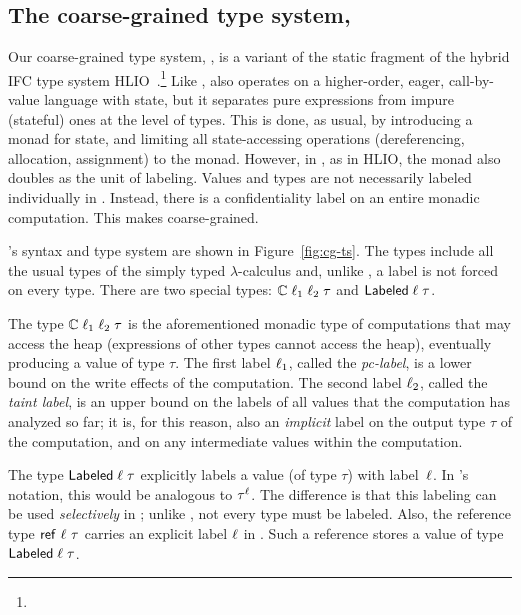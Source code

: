 \subsection{The coarse-grained type system, {\cg}}
\label{sec:cg}



Our coarse-grained type system, {\cg}, is a variant of the static
fragment of the hybrid IFC type system
HLIO~\cite{icfp15-HLIO}.\footnote{} Like {\fg}, {\cg} also operates on a
  higher-order, eager, call-by-value language with state, but it
  separates pure expressions from impure (stateful) ones at the level
  of types. This is done, as usual, by introducing a monad for state,
  and limiting all state-accessing operations (dereferencing,
  allocation, assignment) to the monad. However, in {\cg}, as in HLIO,
  the monad also doubles as the unit of labeling. Values and types are
  not necessarily labeled individually in {\cg}. Instead, there is a
  confidentiality label on an entire monadic computation. This makes
  {\cg} coarse-grained.

{\cg}'s syntax and type system are shown in
Figure~\ref{fig:cg-ts}. The types include all the usual types of the
simply typed $\lambda$-calculus and, unlike {\fg}, a label is not
forced on every type. There are two special types: $\mathbb{C}\;\ell_1\;\ell_2\;\tau$ and $\mathsf{Labeled}\;\ell\;\tau$.

The type $\mathbb{C}\;\ell_1\;\ell_2\;\tau$ is the aforementioned
monadic type of computations that may access the heap (expressions of
other types cannot access the heap), eventually producing a value of
type $\tau$. The first label $\ell_1$, called the \emph{pc-label},
is a lower bound on the write effects of the computation. The second
label $\ell_2$, called the \emph{taint label}, is an upper bound on
the labels of all values that the computation has analyzed so far; it
is, for this reason, also an \emph{implicit} label on the output type
$\tau$ of the computation, and on any intermediate values within the
computation.

The type $\mathsf{Labeled}\;\ell\;\tau$ explicitly labels a value (of type
$\tau$) with label~$\ell$. In {\fg}'s notation, this would be
analogous to $\tau^\ell$. The difference is that this labeling can
be used \emph{selectively} in {\cg}; unlike {\fg}, not every type must
be labeled. Also, the reference type $\mathsf{ref}~\ell~\tau$ carries an
explicit label $\ell$ in {\cg}. Such a reference stores a value of
type $\mathsf{Labeled}\;\ell\;\tau$. 

